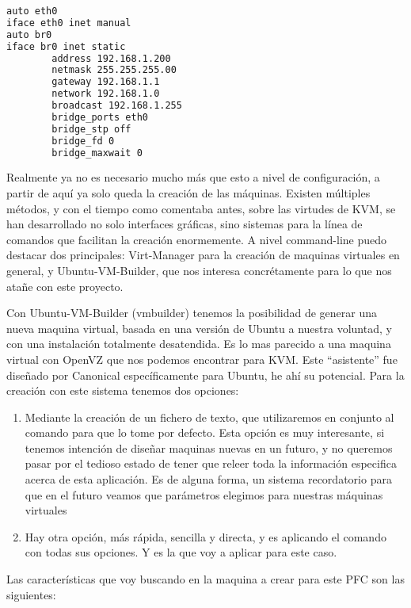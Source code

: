 \begin{lstlisting}[language=bash]
auto eth0
iface eth0 inet manual
auto br0
iface br0 inet static
        address 192.168.1.200
        netmask 255.255.255.00
        gateway 192.168.1.1
        network 192.168.1.0
        broadcast 192.168.1.255
        bridge_ports eth0
        bridge_stp off
        bridge_fd 0
        bridge_maxwait 0
\end{lstlisting}

Realmente ya no es necesario mucho más que esto a nivel de configuración, a partir de aquí ya solo queda la creación de las máquinas. Existen múltiples métodos, y con el tiempo como comentaba antes, sobre las virtudes de KVM, se han desarrollado no solo interfaces gráficas, sino sistemas para la línea de comandos que facilitan la creación enormemente. A nivel command-line puedo destacar dos principales: Virt-Manager para la creación de maquinas virtuales en general, y Ubuntu-VM-Builder, que nos interesa concrétamente para lo que nos atañe con este proyecto.

Con Ubuntu-VM-Builder (vmbuilder) tenemos la posibilidad de generar una nueva maquina virtual, basada en una versión de Ubuntu a nuestra voluntad, y con una instalación totalmente desatendida. Es lo mas parecido a una maquina virtual con OpenVZ que nos podemos encontrar para KVM. Este ``asistente'' fue diseñado por Canonical específicamente para Ubuntu, he ahí su potencial. Para la creación con este sistema tenemos dos opciones:

\begin{enumerate}
\item Mediante la creación de un fichero de texto, que utilizaremos en conjunto al comando para que lo tome por defecto. Esta opción es muy interesante, si tenemos intención de diseñar maquinas nuevas en un futuro, y no queremos pasar por el tedioso estado de tener que releer toda la información especifica acerca de esta aplicación. Es de alguna forma, un sistema recordatorio para que en el futuro veamos que parámetros elegimos para nuestras máquinas virtuales
\item Hay otra opción, más rápida, sencilla y directa, y es aplicando el comando con todas sus opciones. Y es la que voy a aplicar para este caso.
\end{enumerate}

Las características que voy buscando en la maquina a crear para este PFC son las siguientes:

